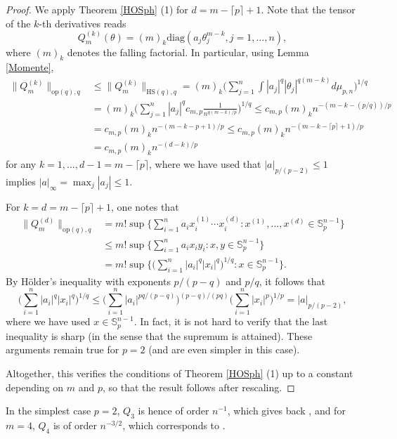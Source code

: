 \documentclass[a4paper,12pt]{amsart}
\numberwithin{equation}{section}
\theoremstyle{remark}
\def\S{{\mathbb S}}
\begin{document}
\begin{proof}
	We apply Theorem \ref{HOSph} (1) for $d=m-\lceil p \rceil +1$. Note that the tensor of the $k$-th derivatives reads 
	\[
	Q_m^{(k)}(\theta) = (m)_k\mathrm{diag}(a_j \theta_j^{m-k}, j=1, \ldots, n),
	\]
	where $(m)_k$ denotes the falling factorial. In particular, using Lemma \ref{Momente},
	\begin{align*}
		\lVert Q_m^{(k)} \rVert_{\mathrm{op}(q),q} &\le \lVert Q_m^{(k)} \rVert_{\mathrm{HS}(q),q}
		= (m)_k\Big( \sum_{j=1}^n \int |a_j|^q |\theta_j|^{q(m-k)} d\mu_{p,n}\Big)^{1/q}\\
		&= (m)_k\Big(\sum_{j=1}^n |a_j|^q c_{m,p} \frac{1}{n^{q(m-k)/p}}\Big)^{1/q}
		\le c_{m,p} (m)_k n^{-(m-k-(p/q))/p}\\
  &= c_{m,p} (m)_k n^{-(m-k-p+1)/p} \le c_{m,p} (m)_k n^{-(m-k-\lceil p \rceil +1)/p}\\
  &= c_{m,p} (m)_kn^{-(d-k)/p}
	\end{align*}
	for any $k=1, \ldots, d-1=m-\lceil p \rceil$, where we have used that $|a|_{p/(p-2)} \le 1$ implies $|a|_\infty = \max_j|a_j| \le 1$.

    For $k=d=m-\lceil p \rceil +1$, one notes that
    \begin{align*}
	\lVert Q_m^{(d)} \rVert_{\mathrm{op}(q),q} &= m!\sup\Big\{\sum_{i=1}^n a_ix_i^{(1)}\cdots x_i^{(d)} \colon x^{(1)}, \ldots, x^{(d)} \in \S_p^{n-1}\Big\}\\
 &\le m!\sup\Big\{\sum_{i=1}^n a_ix_iy_i \colon x,y \in \S_p^{n-1}\Big\}\\
 &= m!\sup\Big\{\Big(\sum_{i=1}^n |a_i|^q|x_i|^q\Big)^{1/q} \colon x \in \S_p^{n-1}\Big\}.
	\end{align*}
 By H\"{o}lder's inequality with exponents $p/(p-q)$ and $p/q$, it follows that
 \[
     \Big(\sum_{i=1}^n |a_i|^q|x_i|^q\Big)^{1/q} \le \Big(\sum_{i=1}^n |a_i|^{pq/(p-q)}\Big)^{(p-q)/(pq)} \Big(\sum_{i=1}^n |x_i|^p\Big)^{1/p} = |a|_{p/(p-2)},
 \]
 where we have used $x \in \S_p^{n-1}$. In fact, it is not hard to verify that the last inequality is sharp (in the sense that the supremum is attained). These arguments remain true for $p=2$ (and are even simpler in this case).
 
 Altogether, this verifies the conditions of Theorem \ref{HOSph} (1) up to a constant depending on $m$ and $p$, so that the result follows after rescaling.
\end{proof}

In the simplest case $p=2$, $Q_3$ is hence of order $n^{-1}$, which gives back \cite[Cor.\ 10.6.2]{BCG23}, and for $m=4$, $Q_4$ is of order $n^{-3/2}$, which corresponds to \cite[Prop.\ 10.7.2]{BCG23}.
\end{document}
